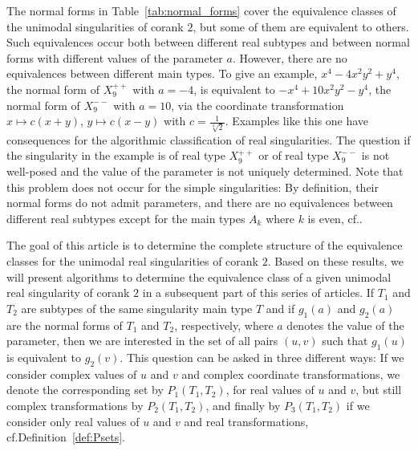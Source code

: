 \documentclass{amsproc}
\theoremstyle{definition}
\begin{document}
The normal forms in Table~\ref{tab:normal_forms} cover the
equivalence classes of the unimodal singularities of corank $2$, but some of
them are equivalent to others. Such equivalences occur both between different
real subtypes and between normal forms with different values of the parameter
$a$. However, there are no equivalences between different main types. To give
an example, $x^4-4x^2y^2+y^4$, the normal form of $X_9^{++}$ with $a = -4$, is
equivalent to $-x^4+10x^2y^2-y^4$, the normal form of $X_9^{--}$ with $a = 10$,
via the coordinate transformation $x \mapsto c(x+y)$, $y \mapsto c(x-y)$ with
$c = \frac{1}{\sqrt[4]{2}}$. Examples like this one have consequences for the
algorithmic classification of real singularities. The question if the
singularity in the example is of real type $X_9^{++}$ or of real type
$X_9^{--}$ is not well-posed and the value of the parameter is not uniquely
determined. Note that this problem does not occur for the simple singularities:
By definition, their normal forms do not admit parameters, and there are no
equivalences between different real subtypes except for the main types $A_k$
where $k$ is even, cf.\@ \citet{MS2013}.

The goal of this article is to determine the complete structure of the
equivalence classes for the unimodal real singularities of corank $2$. Based on
these results, we will present algorithms to determine the equivalence class of
a given unimodal real singularity of corank $2$ in a subsequent part of this
series of articles. If $T_1$ and $T_2$ are subtypes of the same singularity
main type $T$ and if $g_1(a)$ and $g_2(a)$ are the normal forms of $T_1$ and
$T_2$, respectively, where $a$ denotes the value of the parameter, then we are
interested in the set of all pairs $(u, v)$ such that $g_1(u)$ is equivalent to
$g_2(v)$. This question can be asked in three different ways: If we consider
complex values of $u$ and $v$ and complex coordinate transformations, we denote
the corresponding set by $P_1(T_1, T_2)$, for real values of $u$ and $v$, but
still complex transformations by $P_2(T_1, T_2)$, and finally by
$P_3(T_1, T_2)$ if we consider only real values of $u$ and $v$ and real
transformations, cf.\@ Definition~\ref{def:Psets}.
\end{document}
